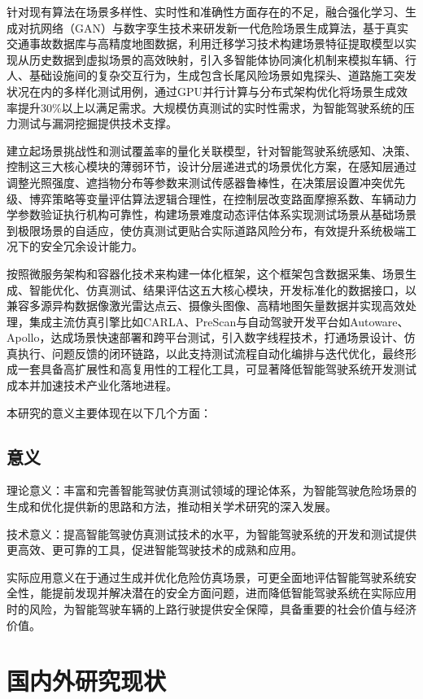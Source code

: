 针对现有算法在场景多样性、实时性和准确性方面存在的不足，融合强化学习、生成对抗网络（GAN）与数字孪生技术来研发新一代危险场景生成算法，基于真实交通事故数据库与高精度地图数据，利用迁移学习技术构建场景特征提取模型以实现从历史数据到虚拟场景的高效映射，引入多智能体协同演化机制来模拟车辆、行人\cite{fitch2012using}、基础设施间的复杂交互行为，生成包含长尾风险场景如鬼探头、道路施工突发状况在内的多样化测试用例，通过GPU并行计算与分布式架构优化将场景生成效率提升30\%以上以满足需求。大规模仿真测试的实时性需求，为智能驾驶系统的压力测试与漏洞挖掘提供技术支撑。​

建立起场景挑战性和测试覆盖率的量化关联模型，针对智能驾驶系统感知、决策、控制这三大核心模块的薄弱环节，设计分层递进式的场景优化方案，在感知层通过调整光照强度、遮挡物分布等参数来测试传感器鲁棒性，在决策层设置冲突优先级、博弈策略等变量评估算法逻辑合理性，在控制层改变路面摩擦系数、车辆动力学参数验证执行机构可靠性\cite{朱西产2019安全切入场景下的驾驶人初始制动时刻分析}，构建场景难度动态评估体系实现测试场景从基础场景到极限场景的自适应，使仿真测试更贴合实际道路风险分布，有效提升系统极端工况下的安全冗余设计能力。​​

按照微服务架构和容器化技术来构建一体化框架，这个框架包含数据采集、场景生成、智能优化、仿真测试、结果评估这五大核心模块，开发标准化的数据接口，以兼容多源异构数据像激光雷达点云、摄像头图像、高精地图矢量数据并实现高效处理，集成主流仿真引擎比如CARLA、PreScan与自动驾驶开发平台如Autoware、Apollo，达成场景快速部署和跨平台测试，引入数字线程技术，打通场景设计、仿真执行、问题反馈的闭环链路，以此支持测试流程自动化编排与迭代优化，最终形成一套具备高扩展性和高复用性的工程化工具，可显著降低智能驾驶系统开发测试成本并加速技术产业化落地进程。

本研究的意义主要体现在以下几个方面：

\subsection{意义}
理论意义：丰富和完善智能驾驶仿真测试领域的理论体系，为智能驾驶危险场景的生成和优化提供新的思路和方法，推动相关学术研究的深入发展。

技术意义：提高智能驾驶仿真测试技术的水平，为智能驾驶系统的开发和测试提供更高效、更可靠的工具，促进智能驾驶技术的成熟和应用。

实际应用意义在于通过生成并优化危险仿真场景，可更全面地评估智能驾驶系统安全性，能提前发现并解决潜在的安全方面问题，进而降低智能驾驶系统在实际应用时的风险，为智能驾驶车辆的上路行驶提供安全保障，具备重要的社会价值与经济价值。

\section{国内外研究现状}

